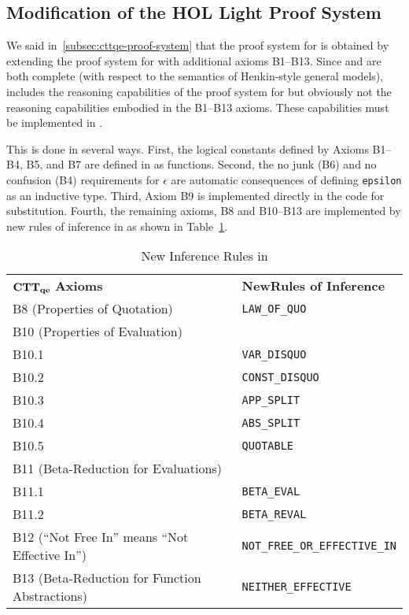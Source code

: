 \documentclass[fleqn]{llncs}
\begin{document}
\subsection{Modification of the HOL Light Proof System}\label{subsec:hlqe-proof-system}

We said in~\ref{subsec:cttqe-proof-system} that the proof system
for {\churchqe} is obtained by extending the proof system for
{\qzero} with additional axioms B1--B13.  Since {\qzero} and
{\HL} are both complete (with respect to the semantics of Henkin-style
general models), {\HL} includes the reasoning capabilities of the proof
system for {\qzero} but obviously not the reasoning capabilities
embodied in the B1--B13 axioms.  These capabilities must be
implemented in {\HLQE}.  

This is done in several ways.  First, the logical constants defined by
Axioms B1--B4, B5, and B7 are defined in {\HLQE} as {\HOL} functions.
Second, the no junk (B6) and no confusion (B4) requirements for
$\epsilon$ are automatic consequences of defining \texttt{epsilon} as
an inductive type.  Third, Axiom B9 is implemented directly
in the {\HL} code for substitution.  Fourth, the remaining axioms, B8
and B10--B13 are implemented by new rules of inference in {\HLQE} as
shown in Table~\ref{tab:axioms}.

\vspace{-2mm}
\begin{table}
\bc
\begin{tabular}{|ll|}
\hline
${\bf CTT_{qe}}$ \textbf{Axioms}                & \textbf{NewRules of Inference}\\
B8 (Properties of Quotation)                     & \texttt{LAW\_OF\_QUO}\\
B10 (Properties of Evaluation)                   & \texttt{}\\
B10.1                                            & \texttt{VAR\_DISQUO}\\
B10.2                                            & \texttt{CONST\_DISQUO}\\
B10.3                                            & \texttt{APP\_SPLIT}\\
B10.4                                            & \texttt{ABS\_SPLIT}\\
B10.5                                            & \texttt{QUOTABLE}\\
B11 (Beta-Reduction for Evaluations)             & \texttt{}\\
B11.1                                            & \texttt{BETA\_EVAL}\\
B11.2                                            & \texttt{BETA\_REVAL}\\
B12 (``Not Free In'' means ``Not Effective In'') & \texttt{NOT\_FREE\_OR\_EFFECTIVE\_IN}\\
B13 (Beta-Reduction for Function Abstractions)  & \texttt{NEITHER\_EFFECTIVE}\\
\hline
\end{tabular}
\ec
\caption{New Inference Rules in {\HLQE}}\label{tab:axioms} 
\end{table}
\end{document}
